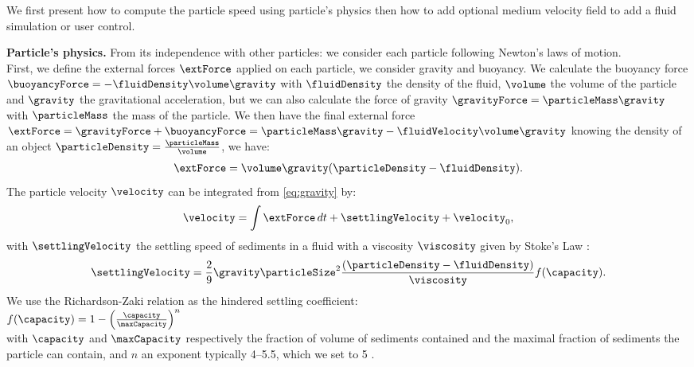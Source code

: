We first present how to compute the particle speed using particle's physics then how to add optional medium velocity field to add a fluid simulation or user control.

\textbf{Particle's physics.}
From its independence with other particles: we consider each particle following Newton's laws of motion.\\
First, we define the external forces $\extForce$ applied on each particle, we consider gravity and buoyancy.
We calculate the buoyancy force $\buoyancyForce = -\fluidDensity \volume \gravity$ with $\fluidDensity$ the density of the fluid, $\volume$ the volume of the particle and $\gravity$ the gravitational acceleration, but we can also calculate the force of gravity $\gravityForce = \particleMass \gravity$ with $\particleMass$ the mass of the particle. We then have the final external force $\extForce = \gravityForce + \buoyancyForce = \particleMass \gravity - \fluidVelocity \volume \gravity$ knowing the density of an object $\particleDensity = \frac{\particleMass}{\volume}$, we have:
\begin{align} \label{eq:gravity}
\extForce = \volume \gravity (\particleDensity - \fluidDensity ).
\end{align}
The particle velocity $\velocity$ can be integrated from \eqref{eq:gravity} by: 
\begin{align} \label{eq:velocity-computation}
\velocity = \int{ \extForce \, dt} + \settlingVelocity + \velocity_0,
\end{align}
with $\settlingVelocity$ the settling speed of sediments in a fluid with a viscosity $\viscosity$ given by Stoke's Law \cite{Stokes1850}: 
\begin{align} \label{eq:initialSettlingVelocity}
\settlingVelocity = \frac{ 2 }{ 9 }  \gravity \particleSize^2 \frac{(\particleDensity - \fluidDensity)}{\viscosity } f(\capacity).
\end{align} 
We use the Richardson-Zaki relation as the hindered settling coefficient: \\
$f(\capacity) = 1 - \left( \frac{\capacity}{ \maxCapacity } \right)^{n}$ \\
with $\capacity$ and $\maxCapacity$ respectively the fraction of volume of sediments contained and the maximal fraction of sediments the particle can contain, and $n$ an exponent typically 4–5.5, which we set to 5 \cite{Richardson1954, Wojtan2007}.


